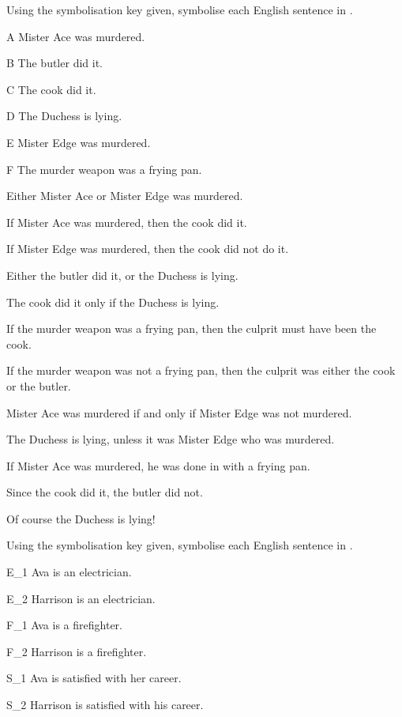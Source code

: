 \problempart Using the symbolisation key given, symbolise each English sentence in \TFL.
\begin{ekey}
\item[A] Mister Ace was murdered.
\item[B] The butler did it.
\item[C] The cook did it.
\item[D] The Duchess is lying.
\item[E] Mister Edge was murdered.
\item[F] The murder weapon was a frying pan.
\end{ekey}
\begin{earg}
\item Either Mister Ace or Mister Edge was murdered.
\item If Mister Ace was murdered, then the cook did it.
\item If Mister Edge was murdered, then the cook did not do it.
\item Either the butler did it, or the Duchess is lying.
\item The cook did it only if the Duchess is lying.
\item If the murder weapon was a frying pan, then the culprit must have been the cook.
\item If the murder weapon was not a frying pan, then the culprit was either the cook or the butler.
\item Mister Ace was murdered if and only if Mister Edge was not murdered.
\item The Duchess is lying, unless it was Mister Edge who was murdered.
\item If Mister Ace was murdered, he was done in with a frying pan.
\item Since the cook did it, the butler did not.
\item Of course the Duchess is lying!
\end{earg}
\problempart Using the symbolisation key given, symbolise each English sentence in \TFL.\label{pr.avacareer}
	\begin{ekey}
		\item[E_1] Ava is an electrician.
		\item[E_2] Harrison is an electrician.
		\item[F_1] Ava is a firefighter.
		\item[F_2] Harrison is a firefighter.
		\item[S_1] Ava is satisfied with her career.
		\item[S_2] Harrison is satisfied with his career.
	\end{ekey}

